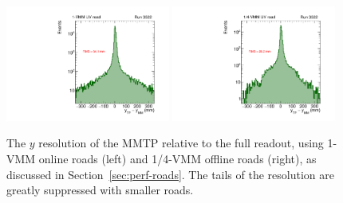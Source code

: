 \begin{figure}[!htpb]
  \begin{center}
    \includegraphics[width=0.48\textwidth]{figures/gbtanalysis3522/TP_yres_1road.pdf}
    \includegraphics[width=0.48\textwidth]{figures/gbtanalysis3522/TP_yres_smallroad.pdf}
  \end{center}
  \vspace{-10pt}
  \caption{The $y$ resolution of the MMTP relative to the full readout, using 1-VMM online roads (left) and 1/4-VMM offline roads (right), as discussed in Section~\ref{sec:perf-roads}. The tails of the resolution are greatly suppressed with smaller roads.}
  \label{fig:yres}
\end{figure}

